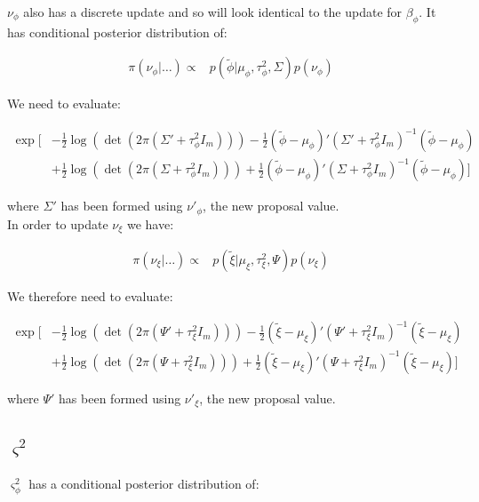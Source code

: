 \documentclass{article}
\begin{document}
$\nu_\phi$ also has a discrete update and so will look identical to the update for $\beta_\phi$. It has conditional posterior distribution of:

\begin{align*}
\pi(\nu_\phi | \dots ) \propto & p(\tilde{\phi} | \mu_\phi, \tau^2_\phi, \Sigma) p(\nu_\phi)
\end{align*}

We need to evaluate:

\begin{align}
\exp \Big[ & - \frac{1}{2}  \log(\det(2 \pi (\Sigma' + \tau^2_\phi I_m))) -\frac{1}{2} (\tilde{\phi} - \mu_\phi)' (\Sigma' + \tau^2_\phi I_m)^{-1} (\tilde{\phi} - \mu_\phi) \nonumber \\
& + \frac{1}{2} \log(\det(2 \pi (\Sigma + \tau^2_\phi I_m))) + \frac{1}{2} (\tilde{\phi} - \mu_\phi)' (\Sigma + \tau^2_\phi I_m)^{-1} (\tilde{\phi} - \mu_\phi) \Big] \label{eq:2n1}
\end{align}

where $\Sigma'$ has been formed using $\nu'_\phi$, the new proposal value. \\

In order to update $\nu_\xi$ we have:

\begin{align*}
\pi(\nu_\xi | \dots ) \propto & p(\tilde{\xi} | \mu_\xi, \tau^2_\xi, \Psi) p(\nu_\xi)
\end{align*}

We therefore need to evaluate:

\begin{align}
\exp \Big[ & -\frac{1}{2} \log(\det(2 \pi (\Psi' + \tau^2_\xi I_m))) -\frac{1}{2} (\tilde{\xi} - \mu_\xi)' (\Psi' + \tau^2_\xi I_m)^{-1} (\tilde{\xi} - \mu_\xi) \nonumber \\
& + \frac{1}{2} \log(\det(2 \pi (\Psi + \tau^2_\xi I_m)))+ \frac{1}{2} (\tilde{\xi} - \mu_\xi)' (\Psi + \tau^2_\xi I_m)^{-1} (\tilde{\xi} - \mu_\xi) \Big] \label{eq:2n2}
\end{align}

where $\Psi'$ has been formed using $\nu'_\xi$, the new proposal value. \\

\subsection{$\varsigma^2$}

$\varsigma^2_\phi$ has a conditional posterior distribution of:
\end{document}
